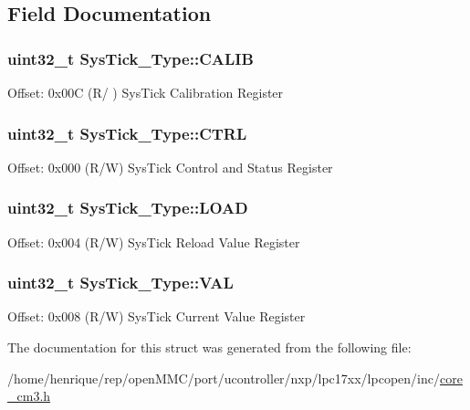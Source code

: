 \subsection{Field Documentation}
\hypertarget{structSysTick__Type_a9c9eda0ea6f6a7c904d2d75a6963e238}{
\subsubsection[{C\-A\-L\-I\-B}]{ uint32\-\_\-t Sys\-Tick\-\_\-\-Type\-::\-C\-A\-L\-I\-B}}\label{structSysTick__Type_a9c9eda0ea6f6a7c904d2d75a6963e238}
Offset\-: 0x00\-C (R/ ) Sys\-Tick Calibration Register \hypertarget{structSysTick__Type_af2ad94ac83e5d40fc6e34884bc1bec5f}{
\subsubsection[{C\-T\-R\-L}]{ uint32\-\_\-t Sys\-Tick\-\_\-\-Type\-::\-C\-T\-R\-L}}\label{structSysTick__Type_af2ad94ac83e5d40fc6e34884bc1bec5f}
Offset\-: 0x000 (R/\-W) Sys\-Tick Control and Status Register \hypertarget{structSysTick__Type_ae7bc9d3eac1147f3bba8d73a8395644f}{
\subsubsection[{L\-O\-A\-D}]{ uint32\-\_\-t Sys\-Tick\-\_\-\-Type\-::\-L\-O\-A\-D}}\label{structSysTick__Type_ae7bc9d3eac1147f3bba8d73a8395644f}
Offset\-: 0x004 (R/\-W) Sys\-Tick Reload Value Register \hypertarget{structSysTick__Type_a0997ff20f11817f8246e8f0edac6f4e4}{
\subsubsection[{V\-A\-L}]{ uint32\-\_\-t Sys\-Tick\-\_\-\-Type\-::\-V\-A\-L}}\label{structSysTick__Type_a0997ff20f11817f8246e8f0edac6f4e4}
Offset\-: 0x008 (R/\-W) Sys\-Tick Current Value Register 

The documentation for this struct was generated from the following file\-:\begin{DoxyCompactItemize}
\item 
/home/henrique/rep/open\-M\-M\-C/port/ucontroller/nxp/lpc17xx/lpcopen/inc/\hyperlink{core__cm3_8h}{core\-\_\-cm3.\-h}\end{DoxyCompactItemize}
